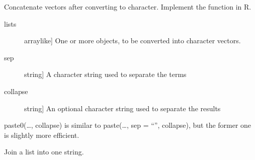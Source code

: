 \documentclass[a4paper,11pt,english]{sphinxmanual}
\begin{document}
\begin{fulllineitems}
\label{\detokenize{model_code:src.model_code.utils.paste}}
\sphinxAtStartPar
Concatenate vectors after converting to character.
Implement the function  in R.
\begin{description}
\item[{lists}] \leavevmode{[}array\sphinxhyphen{}like{]}
\sphinxAtStartPar
One or more objects, to be converted into character vectors.

\item[{sep}] \leavevmode{[}string{]}
\sphinxAtStartPar
A character string used to separate the terms

\item[{collapse}] \leavevmode{[}string{]}
\sphinxAtStartPar
An optional character string used to separate the results

\end{description}

\end{fulllineitems}


\begin{fulllineitems}
\label{\detokenize{model_code:src.model_code.utils.paste0}}
\sphinxAtStartPar
paste0(…, collapse) is similar to paste(…, sep = “”, collapse), but the former
one is slightly more efficient.

\end{fulllineitems}


\begin{fulllineitems}
\label{\detokenize{model_code:src.model_code.utils.reduce_concat}}
\sphinxAtStartPar
Join a list into one string.

\end{fulllineitems}
\end{document}
